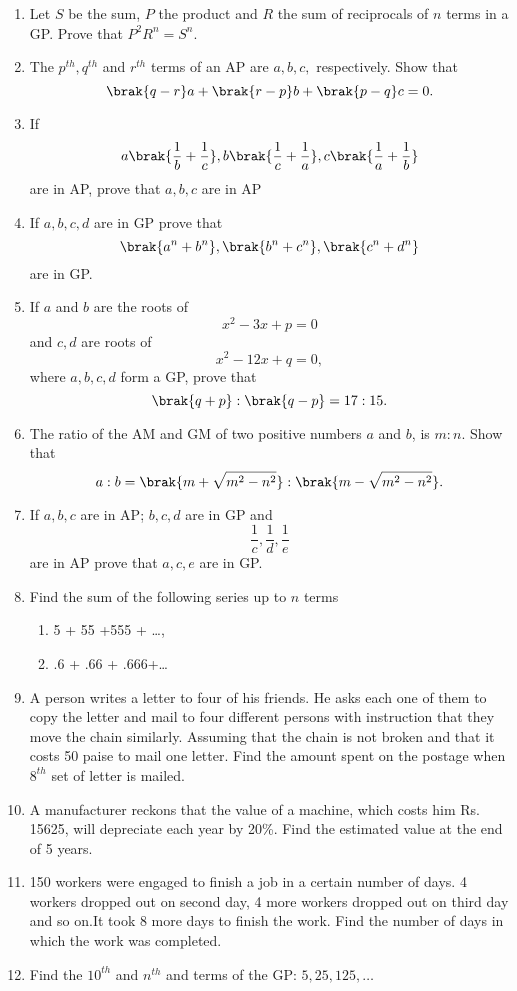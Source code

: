 \begin{enumerate}[label=\thesubsection.\arabic*.,ref=\thesubsection.\theenumi]
\item Let $S$ be the sum, $P$ the product and $R$ the sum of reciprocals of $n$ terms in a GP.  Prove that $P^2R^n = S^n.$ 
\item The $p^{th}, q^{th}$ and $r^{th}$ terms of an AP  are $a, b, c,$ respectively. Show that 
$$\brak{q - r }a + \brak{r - p }b + \brak{p - q }c = 0.$$
\item If $$a\brak{\frac{1}{b}+\frac{1}{c}}, b\brak{\frac{1}{c}+\frac{1}{a}}, c\brak{\frac{1}{a}+\frac{1}{b}}$$ are in AP, prove that $a, b, c$ are in AP 
\item If $a, b, c, d$ are in GP  prove that $$\brak{a^n + b^n}, \brak{b^n + c^n}, \brak{c^n + d^n}$$ are in GP. 
\item If $a$ and $b$ are the roots of $$x^2 - 3x + p = 0$$ and $c, d$ are roots of $$x^2 - 12x + q = 0,$$ where $a, b, c, d$ form a GP,  prove that $$\brak{q + p} : \brak{q - p} = 17:15.$$
\item The ratio of the AM  and GM  of two positive numbers $a$ and $b$, is $m : n$. Show that 
$$a:b = \brak{m+\sqrt{m^2 - n^2}}:\brak{m - \sqrt{m^2 - n^2}}.$$
\item If $a, b, c$ are in AP; $b, c, d$ are in GP  and $$\frac{1}{c}, \frac{1}{d}, \frac{1}{e}$$ are in AP  prove that $a, c, e$ are in GP.
\item Find the sum of the following series up to $n$ terms
\begin{enumerate}
\item 5 + 55 +555 + \dots, 
\item .6 + .66 + .666+\dots 
\end{enumerate}
\item A person writes a letter to four of his friends. He asks each one of them to copy
the letter and mail to four different persons with instruction that they move the
chain similarly. Assuming that the chain is not broken and that it costs 50 paise to
mail one letter. Find the amount spent on the postage when $8^{th}$ set of letter is
mailed. 
\item A manufacturer reckons that the value of a machine,  which costs him Rs. 15625,  will depreciate each year by 20\%. Find the estimated value at the end of 5 years. 
\item 150 workers were engaged to finish a job in a certain number of days. 4 workers dropped out on second day,  4 more workers dropped out on third day and so on.It took 8 more days to finish the work. Find the number of days in which the work was completed.
	\item Find the $10^{th}$ and $n^{th}$ and  terms of the GP: $5, 25, 125, \dots$

\end{enumerate}
